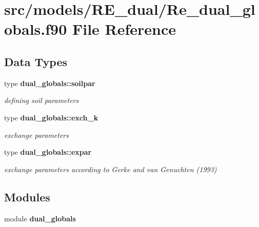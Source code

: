 \section{src/models/\+R\+E\+\_\+dual/\+Re\+\_\+dual\+\_\+globals.f90 File Reference}
\label{_re__dual__globals_8f90}
\subsection*{Data Types}
\begin{DoxyCompactItemize}
\item 
type {\bf dual\+\_\+globals\+::soilpar}
\begin{DoxyCompactList}\small\item\em defining soil parameters \end{DoxyCompactList}\item 
type {\bf dual\+\_\+globals\+::exch\+\_\+k}
\begin{DoxyCompactList}\small\item\em exchange parameters \end{DoxyCompactList}\item 
type {\bf dual\+\_\+globals\+::expar}
\begin{DoxyCompactList}\small\item\em exchange parameters according to Gerke and van Genuchten (1993) \end{DoxyCompactList}\end{DoxyCompactItemize}
\subsection*{Modules}
\begin{DoxyCompactItemize}
\item 
module {\bf dual\+\_\+globals}
\end{DoxyCompactItemize}
